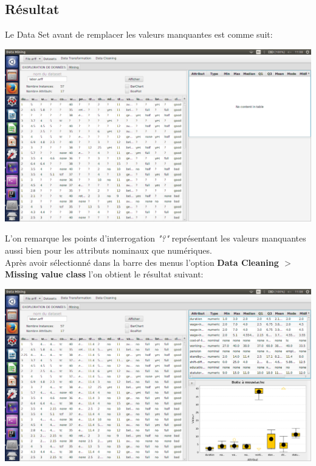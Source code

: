 \documentclass[12pt,a4paper,oneside]{book}
\begin{document}
\subsection{Résultat}
Le Data Set avant de remplacer les valeurs manquantes est comme suit: 
\begin{center}
	\includegraphics[width=1\textwidth]{screens/avantMissing.png}%
	\label{labelname}%
\end{center}

L'on remarque les points d'interrogation \textit{"?"} représentant les valeurs manquantes aussi bien pour les attributs nominaux que numériques.\\

Après avoir sélectionné dans la barre des menus l'option \textbf{Data Cleaning $>$ Missing value class} l'on obtient le résultat suivant:

\begin{center}
	\includegraphics[width=1\textwidth]{screens/apresMissing.png}%
	\label{labelname}%
\end{center}
\end{document}
